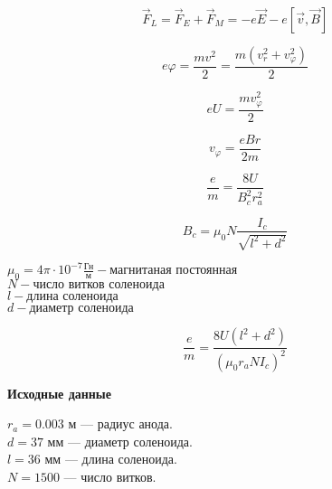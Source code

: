 \[
    \vec{F}_L = \vec{F}_E + \vec{F}_M = -e\vec{E} -e [\vec{v}, \vec{B}]
\]

\[
    e\varphi = \frac{mv^2}{2} = \frac{m (v_r^2 + v_\varphi^2)}{2}
\]

\[
    eU = \frac{m v_\varphi^2}{2}
\]

\[
    v_\varphi = \frac{e B r}{2m}
\]

\[
    \frac{e}{m} = \frac{8 U}{B_c^2 r_a^2}
\]

\[
    B_c = \mu_0 N \frac{I_c}{\sqrt{l^2 + d^2}}
\]

\begin{center}
    $\mu_0 = 4\pi\cdot10^{-7} \frac{\text{Гн}}{\text{м}} - \text{магнитаная постоянная}$ \\
    $N - \text{число витков соленоида}$ \\
    $l - \text{длина соленоида}$ \\
    $d - \text{диаметр соленоида}$
\end{center}

\[
    \frac{e}{m} = \frac{8U (l^2 + d^2)}{(\mu_0 r_a N I_c)^2}
\]

\textbf{Исходные данные}
\begin{center}
    $r_a = 0.003$ м — радиус анода. \\
    $d = 37$ мм — диаметр соленоида. \\
    $l = 36$ мм — длина соленоида. \\
    $N = 1500$ — число витков. \\
\end{center}